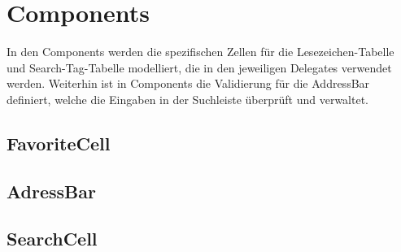 
\section{Components}

In den Components werden die spezifischen Zellen für die Lesezeichen-Tabelle und Search-Tag-Tabelle modelliert, die in den jeweiligen Delegates verwendet werden. Weiterhin ist in Components die Validierung für die AddressBar definiert, welche die Eingaben in der Suchleiste überprüft und verwaltet.

\subsection{FavoriteCell}
\subsection{AdressBar}
\subsection{SearchCell}

